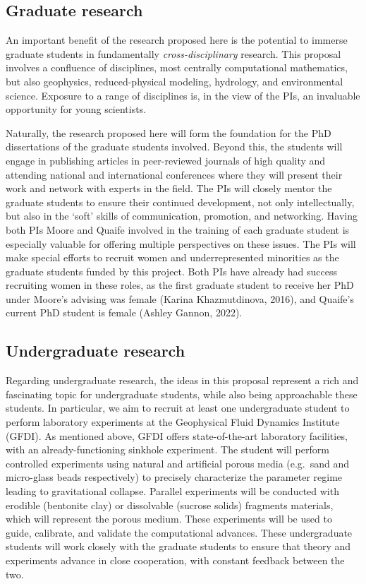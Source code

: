 \documentclass[11pt]{article}
\begin{document}
\subsection{Graduate research}
An important benefit of the research proposed here is the potential to immerse graduate students in fundamentally {\em cross-disciplinary} research. This proposal involves a confluence of disciplines, most centrally computational mathematics, but also geophysics, reduced-physical modeling, hydrology, and environmental science.  Exposure to a range of disciplines is, in the view of the PIs, an invaluable opportunity for young scientists.

Naturally, the research proposed here will form the foundation for the
PhD dissertations of the graduate students involved. Beyond this, the
students will engage in publishing articles in peer-reviewed journals of
high quality and attending national and international conferences where
they will present their work and network with experts in the field. The
PIs will closely mentor the graduate students to ensure their continued
development, not only intellectually, but also in the `soft' skills of
communication, promotion, and networking. Having both PIs Moore and
Quaife involved in the training of each graduate student is especially
valuable for offering multiple perspectives on these issues. The PIs
will make special efforts to recruit women and underrepresented
minorities as the graduate students funded by this project. Both PIs
have already had success recruiting women in these roles, as the first
graduate student to receive her PhD under Moore's advising was female
(Karina Khazmutdinova, 2016), and Quaife's current PhD student is female
(Ashley Gannon, 2022).


\subsection{Undergraduate research}
Regarding undergraduate research, the ideas in this proposal represent a rich and fascinating topic for undergraduate students, while also being approachable these students. In particular, we aim to recruit at least one undergraduate student to perform laboratory experiments at the Geophysical Fluid Dynamics Institute (GFDI). As mentioned above, GFDI offers state-of-the-art laboratory facilities, with an already-functioning sinkhole experiment. The student will perform controlled experiments using natural and artificial porous media (e.g.~sand and micro-glass beads respectively) to precisely characterize the parameter regime leading to gravitational collapse. Parallel experiments will be conducted with erodible (bentonite clay) or dissolvable  (sucrose solids) fragments materials, which will represent the porous medium. These experiments will be used to guide, calibrate, and validate the computational advances. These undergraduate students will work closely with the graduate students to ensure that theory and experiments advance in close cooperation, with constant feedback between the two.
\end{document}
